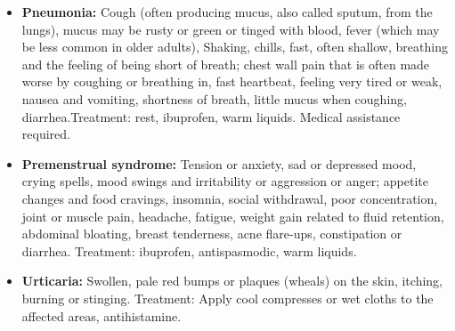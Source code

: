 \begin{itemize}
\item \textbf{Pneumonia: } Cough (often producing mucus, also called sputum, from the lungs), mucus may be rusty or green or tinged with blood, fever (which may be less common in older adults), Shaking,  chills, fast, often shallow, breathing and the feeling of being short of breath; chest wall pain that is often made worse by coughing or breathing in, fast heartbeat, feeling very tired or weak, nausea and vomiting, shortness of breath, little mucus when coughing, diarrhea.Treatment: rest, ibuprofen, warm liquids. Medical assistance required.

\item \textbf{Premenstrual syndrome: } Tension or anxiety, sad or depressed mood, crying spells, mood swings and irritability or aggression or anger; appetite changes and food cravings, insomnia, social withdrawal, poor concentration, joint or muscle pain, headache, fatigue, weight gain related to fluid retention, abdominal bloating, breast tenderness, acne flare-ups, constipation or diarrhea. Treatment: ibuprofen, antispasmodic, warm liquids.






\item \textbf{Urticaria:} Swollen, pale red bumps or plaques (wheals) on the skin, itching, burning or stinging. Treatment: Apply cool compresses or wet cloths to the affected areas, antihistamine.

\end{itemize}

